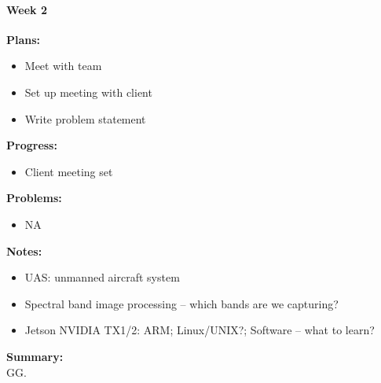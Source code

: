\paragraph{Week 2}
\begin{adjustwidth}{2.5em}{0pt}
    \vspace{-0.5cm}\textbf{Plans:}
    \vspace{-0.5cm}
    \begin{itemize}
        \item  Meet with team
        \item  Set up meeting with client
        \item  Write problem statement
    \end{itemize} 
    \vspace{-0.3cm}\textbf{Progress:}
    \vspace{-0.5cm}
    \begin{itemize}
        \item Client meeting set
    \end{itemize} 
    \vspace{-0.3cm}\textbf{Problems:}
    \vspace{-0.5cm}
    \begin{itemize}
        \item NA
    \end{itemize}  
    \vspace{-0.3cm}\textbf{Notes:}
    \vspace{-0.5cm}
    \begin{itemize}
        \item UAS: unmanned aircraft system
        \item Spectral band image processing -- which bands are we capturing?
        \item Jetson NVIDIA TX1/2: ARM; Linux/UNIX?; Software -- what to learn?
  
    \end{itemize} 
    \vspace{-0.3cm}\noindent\textbf{Summary:}\\
    \noindent
    GG.
\end{adjustwidth} 


